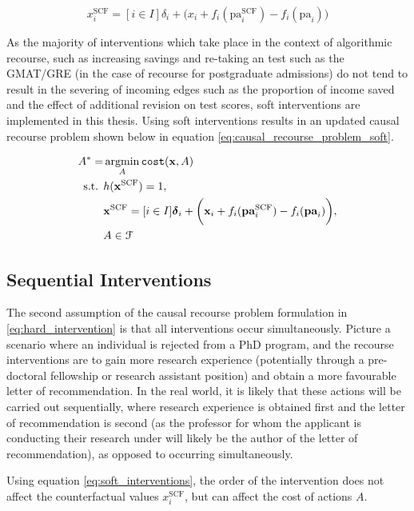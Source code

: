 \begin{equation} \label{eq:soft_interventions}
	x^{\text{SCF}}_i = [i \in I] \delta_i + \bigg( x_i + f_i(\text{pa}^{\text{SCF}}_i) - f_i(\text{pa}_i) \bigg)
\end{equation}

As the majority of interventions which take place in the context of algorithmic recourse, such as increasing savings and re-taking an test such as the GMAT/GRE (in the case of recourse for postgraduate admissions) do not tend to result in the severing of incoming edges such as the proportion of income saved and the effect of additional revision on test scores, soft interventions are implemented in this thesis. Using soft interventions results in an updated causal recourse problem shown below in equation \ref{eq:causal_recourse_problem_soft}.

\begin{align} \label{eq:causal_recourse_problem_soft}
	A^* = & \operatorname*{argmin}_{A} \texttt{cost}(\mathbf{x}, A) \\ \nonumber
	\text{s.t. } & h(\mathbf{x}^{\text{SCF}}) = 1, \\ \nonumber
	& 	\mathbf{x}^{\text{SCF}} = [i \in I] \boldsymbol{\delta}_i + \bigg( \mathbf{x}_i + f_i(\textbf{pa}^{\text{SCF}}_i) - f_i(\textbf{pa}_i) \bigg), \\ \nonumber
	& A \in \mathcal{F}
\end{align} 


\subsection{Sequential Interventions}

The second assumption of the causal recourse problem formulation in \ref{eq:hard_intervention} is that all interventions occur simultaneously. Picture a scenario where an individual is rejected from a PhD program, and the recourse interventions are to gain more research experience (potentially through a pre-doctoral fellowship or research assistant position) and obtain a more favourable letter of recommendation. In the real world, it is likely that these actions will be carried out sequentially, where research experience is obtained first and the letter of recommendation is second (as the professor for whom the applicant is conducting their research under will likely be the author of the letter of recommendation), as opposed to occurring simultaneously.

Using equation \ref{eq:soft_interventions}, the order of the intervention does not affect the counterfactual values $x^{\text{SCF}}_i$, but can affect the cost of actions $A$.


